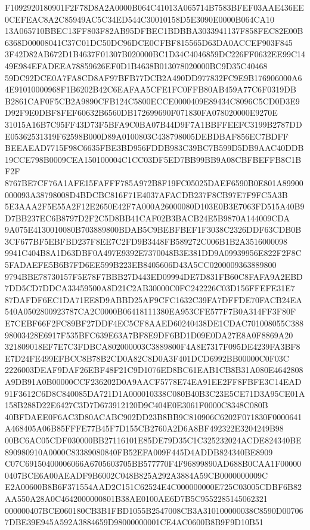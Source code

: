 \documentclass[UTF8,fontset=fandol,zihao=-4,a4paper]{ctexart}
\begin{document}
{{F1092920180901F2F78D8A2A0000B064C41013A065714B7583BFEF03AAE436EE0CEFEAC8A2C85949AC5C34ED544C30010158D5E3090E0000B064CA10
13A065710BBEC13FF803F82AB95DFBEC1BDBBA3033941137F858FEC82E00B6368D00008041C37C01DC50DC96DCE0CFBF815565D63DA0ACCEF903F845
3F42D82AB672D1B4637F01307B020000BC1D34C4046859DC226FF0632EE99C1449E984EFADEEA78859626EF0D1B4638B013078020000BC9D35C40468
59DC92DCE0A7FA8CD8AF97BFB77DCB2A490DD977832FC9E9B176906000A64E91010000968F1B6202B42C6EAFAA5CFE1FC0FFB80AB459A77C6F0319DB
B2861CAF0F5CB2A9890CFB124C5800ECCE0000409E89434C8096C5CD0D3E9D92F9E0DBF8FEF60632B6560DB172699690F071830FA078020000E9270E
31015A16B7C95FF43D73F5BFA9C0BA07B44D9F7A1BBFFEEFC3199B2787DDE05362531319F62598B000D89A0100803C438798005DEBDBAF856EC7BDFF
BEEAEAD7715F98C6635FBE3BD956FDDB983C39BC7B599D5DB9AAC40DDB19CCE798B0009CEA150100004C1CC03DF5ED7BB99BB9A08CBFBEFFB8C1BF2F
8767BE7CF76A1AFE15FAFFF785A972B8F19FC05025DAEF6590B0E801A89900000093A38798008D4BDCBC816F71E4037AFACDB237F8CB97E7F9FC5A3B
5E3AAA2F5E55A2F12E2650E42F7A000A26000080D103E0B3E7063FD515A40B9D7BB237EC6B8797D2F2C5D8BB41CAF02B3BACB24E5B9870A144009CDA
9A075E4130010080B703889800BDAB5C9BEBFBEF1F3038C2326DDF63CDB0B3CF677BF5EBFBD237F8EE7C2FD9B3448FB589272C006B1B2A3516000098
9941C404B8A1D63DBF0A497E9392E7370048B3E381DD9A09939956E822F2F8C5FADAEFE5B6B7FD6EE599B223EB8405606D43A5CC0200009363889800
9794BBE78730157F5E78F7BBB27D443ED09994DE7D831FB60C8FAFA9A2EBD7DD5CD7DDCA33459500A8D21C2AB30000C0FC242226C03D156FFEFE31E7
87DAFDF6EC1DA71EE8D9ABBD25AF9CFC1632C39FA7DFFDE70FACB24EA540A0502800923787CA2C0000B06418111380EA953CFE577F7B0A314FF3F80F
E7CEBF66F2FC89BF27DDF4EC5CF8AAED60240438DE1CDAC701008055C38898003428E6917F535BFC639E63A7BF8E9DF6BD1D09E0DA27E8A0F8869A20
321809018EF7E7C3FDBCA802000003C3889800F4A8E7317F095DE4239FA3BF8E7D24FE499EFBCC8B78B2CD0A82C8D0A3F401DCD6992BB00000C0F03C
2226003DEAF9DAF26EBF48F21C9D1076ED8BC61EAB1CB8B31A080E4642808A9DB91A0B00000CCF236202D0A9AACF5778E74EA91EE2FF8FBFE3C14EAD
91F3612C6D8C840085DA721D1A000010338C080B40B3C23E5CE71D3A95CE01A158B288D22E6427C3D7D673912120D9C404E0E3061F0000C8348C080B
40BFDAEE0F6AC3D80ACABC902DD23B8BB9C810906C6202F071830F0000641A468405A06B85FFFE77B45F7D155CB2760A2D6A8BF492322E3204249B98
00BC6AC05CDF030000BB27116101E85DE79D35C1C325232024ACDE824340BE890980910A0000C83389080840FB52EFA009F445D4ADDB824340BE8909
C07C69150400006066A6705603705BB577770F4F96899890AD688B0CAA1F000000407BCE6A00AEADF9B6002C048B825A292A3884A59CB0000000009C
E2A00600B8B6F371554AAD2C151C62524E4C000000000E725C03005CDBF6B82AA550A28A0C4642000000801B38AE0100AE6D7B5C9552285145062321
000000407BCE060180CB3B1FBD1055B2547008CB3A310100000038C8590D007067DBE39E945A592A3884659D98000000001CE4AC0600B8B9F9D10B51
}}
\end{document}
